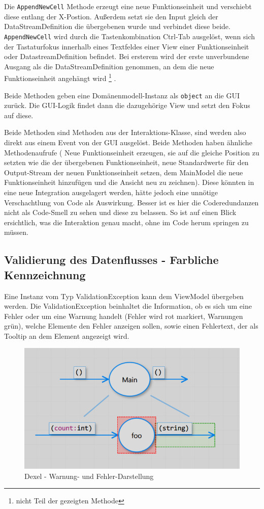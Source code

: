 	Die \texttt{AppendNewCell} Methode erzeugt eine neue Funktionseinheit und 
	verschiebt diese entlang der X-Postion.
	Außerdem setzt sie den Input gleich der DataStreamDefinition die
	übergebenen wurde und verbindet diese beide.
	\texttt{AppendNewCell} wird durch die Tastenkombination Ctrl-Tab ausgelöst, wenn
	sich der Tastaturfokus innerhalb eines Textfeldes einer View einer Funktionseinheit oder
	DatastreamDefinition befindet. Bei ersterem wird der erste unverbundene
  Ausgang als die	DataStreamDefinition genommen, an dem die neue Funktionseinheit angehängt wird \footnote{nicht Teil der gezeigten Methode} .
	
	Beide Methoden geben eine
	Domänenmodell-Instanz als \texttt{object} an die GUI zurück. Die GUI-Logik findet dann die
	dazugehörige View und setzt den Fokus auf diese.
	
	Beide Methoden sind Methoden aus der Interaktions-Klasse, sind werden also
	direkt aus einem Event von der GUI ausgelöst. 
	Beide Methoden haben ähnliche Methodenaufrufe ( Neue Funktionseinheit
	erzeugen, sie auf die gleiche Position zu setzten wie die der übergebenen
	Funktionseinheit, neue Standardwerte für den Output-Stream der neuen
	Funktionseinheit setzen, dem MainModel die neue Funktionseinheit hinzufügen
  und die Ansicht neu zu zeichnen).
  Diese könnten in eine neue Integration ausgelagert werden, hätte jedoch eine unnötige
	Verschachtlung von Code als Auswirkung. Besser ist es hier die
	Coderedundanzen nicht als Code-Smell zu sehen und diese zu belassen.
	So ist auf einen Blick ersichtlich, was die Interaktion genau macht, ohne
	im Code herum springen zu müssen.






\subsection{Validierung des Datenflusses - Farbliche Kennzeichnung }

Eine Instanz vom Typ ValidationException kann dem ViewModel übergeben werden.
Die ValidationException beinhaltet die Information, ob es sich um eine Fehler oder um eine Warnung handelt (Fehler wird rot markiert, Warnungen grün), welche Elemente den Fehler anzeigen sollen, sowie einen Fehlertext, der als Tooltip an dem Element angezeigt wird.

\begin{figure}[H]
	\centering
	\includegraphics[width=0.6\linewidth]{./img/DexelValidation.png}
	\caption{Dexel - Warnung- und Fehler-Darstellung}
\end{figure}



